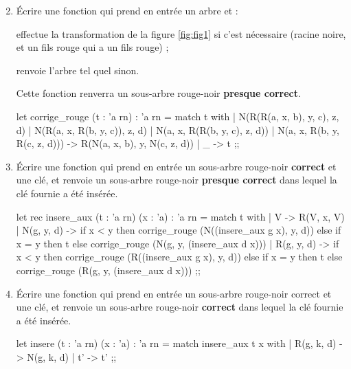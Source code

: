 \documentclass[a4paper,french,bookmarks]{article}
\newcommand{\rouge}{{\color{main9} rouge}}
\begin{document}
\begin{enumerate}
    \setcounter{enumi}{1}
    \item Écrire une fonction  qui prend en entrée un arbre et :
    \begin{enumerate}
        \itt effectue la transformation de la figure \ref{fig:fig1} si c'est nécessaire (racine noire, et un fils \rouge{} qui a un fils \rouge{}) ;
        
        \itt renvoie l'arbre tel quel sinon.
    \end{enumerate}
    Cette fonction renverra un sous-arbre \rouge{}-noir \textbf{presque correct}.
    
    \begin{ocaml}
let corrige_rouge (t : 'a rn) : 'a rn = match t with
    | N(R(R(a, x, b), y, c), z, d) | N(R(a, x, R(b, y, c)), z, d)
    | N(a, x, R(R(b, y, c), z, d)) | N(a, x, R(b, y, R(c, z, d)))
     -> R(N(a, x, b), y, N(c, z, d))
    | _ -> t
;;
    \end{ocaml}
    
    \item Écrire une fonction  qui prend en entrée un sous-arbre \rouge{}-noir \textbf{correct} et une clé, et renvoie un sous-arbre \rouge{}-noir \textbf{presque correct} dans lequel la clé fournie a été insérée.
    
    \begin{ocaml}
let rec insere_aux (t : 'a rn) (x : 'a) : 'a rn = match t with
    | V -> R(V, x, V)
    | N(g, y, d) -> if x < y then corrige_rouge (N((insere_aux g x), y, d))
     else if x = y then t else corrige_rouge (N(g, y, (insere_aux d x)))
    | R(g, y, d) -> if x < y then corrige_rouge (R((insere_aux g x), y, d))
     else if x = y then t else corrige_rouge (R(g, y, (insere_aux d x)))
;;
    \end{ocaml}
    
    \item Écrire une fonction  qui prend en entrée un sous-arbre \rouge{}-noir correct et une clé, et renvoie un sous-arbre \rouge{}-noir \textbf{correct} dans lequel la clé fournie a été insérée.
    
    \begin{ocaml}
let insere (t : 'a rn) (x : 'a) : 'a rn = match insere_aux t x with
    | R(g, k, d) -> N(g, k, d)
    | t' -> t'
;;
    \end{ocaml}

\end{enumerate}
\end{document}
